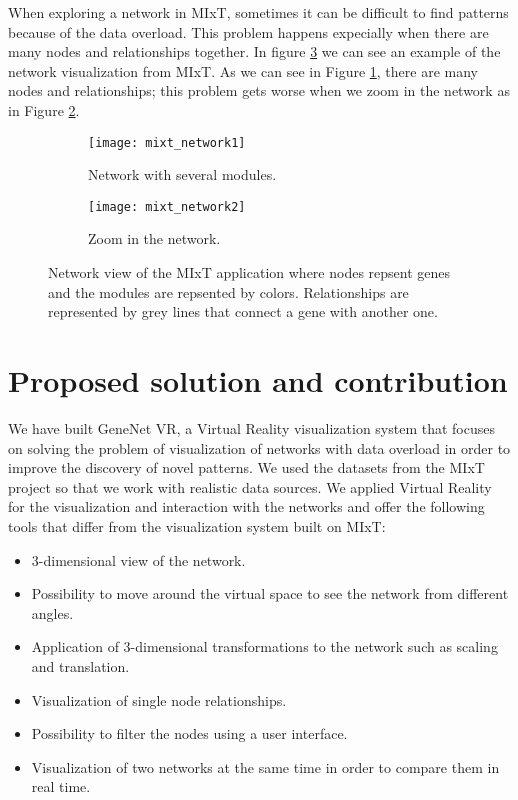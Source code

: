 When exploring a network in MIxT, sometimes it can be difficult to find patterns because of the data overload. This problem happens expecially when there are many nodes and relationships together. In figure \ref{fig:mixt_network} we can see an example of the network visualization from MIxT. As we can see in Figure \ref{fig:mixt_network1}, there are many nodes and relationships; this problem gets worse when we zoom in the network as in Figure \ref{fig:mixt_network_zoom}.

\begin{figure}[h!]
    \centering%
    \begin{subfigure}[t]{0.5\textwidth}
        \centering%
        \texttt{[image: mixt\_network1]}
        \caption{Network with several modules.}
        \label{fig:mixt_network1}
    \end{subfigure}%
    \begin{subfigure}[t]{0.5\textwidth}
        \centering%
        \texttt{[image: mixt\_network2]}
        \caption{Zoom in the network.}
        \label{fig:mixt_network_zoom}
    \end{subfigure}

    \caption{Network view of the MIxT application where nodes repsent genes and the modules are repsented by colors. Relationships are represented by grey lines that connect a gene with another one.}
    \label{fig:mixt_network}
\end{figure}

\section{Proposed solution and contribution}
We have built GeneNet VR, a Virtual Reality visualization system that focuses on solving the problem of visualization of networks with data overload in order to improve the discovery of novel patterns. We used the datasets from the MIxT project so that we work with realistic data sources. We applied Virtual Reality for the visualization and interaction with the networks and offer the following tools that differ from the visualization system built on MIxT:

\begin{itemize}
  \item 3-dimensional view of the network.
  \item Possibility to move around the virtual space to see the network from different angles.
  \item Application of 3-dimensional transformations to the network such as scaling and translation.
  \item Visualization of single node relationships.
  \item Possibility to filter the nodes using a user interface.
  \item Visualization of two networks at the same time in order to compare them in real time.
\end{itemize}

